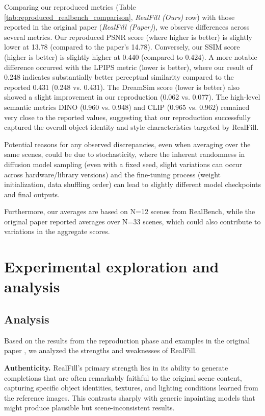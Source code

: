 \documentclass{article}
\begin{document}
Comparing our reproduced metrics (Table \ref{tab:reproduced_realbench_comparison}, \emph{RealFill (Ours)} row) with those reported in the original paper (\emph{RealFill (Paper)}), we observe differences across several metrics.
Our reproduced PSNR score (where higher is better) is slightly lower at 13.78 (compared to the paper's 14.78).
Conversely, our SSIM score (higher is better) is slightly higher at 0.440 (compared to 0.424).
A more notable difference occurred with the LPIPS metric (lower is better), where our result of 0.248 indicates substantially better perceptual similarity compared to the reported 0.431 (0.248 vs. 0.431).
The DreamSim score (lower is better) also showed a slight improvement in our reproduction (0.062 vs. 0.077).
The high-level semantic metrics DINO (0.960 vs. 0.948) and CLIP (0.965 vs. 0.962) remained very close to the reported values, suggesting that our reproduction successfully captured the overall object identity and style characteristics targeted by RealFill.

Potential reasons for any observed discrepancies, even when averaging over the same scenes, could be due to stochasticity, where the inherent randomness in diffusion model sampling (even with a fixed seed, slight variations can occur across hardware/library versions) and the fine-tuning process (weight initialization, data shuffling order) can lead to slightly different model checkpoints and final outputs.

Furthermore, our averages are based on N=12 scenes from RealBench, while the original paper reported averages over N=33 scenes, which could also contribute to variations in the aggregate scores.

\section{Experimental exploration and analysis}
\label{sec:exploration}

\subsection{Analysis}

\label{subsec:original_performance_analysis}
Based on the results from the reproduction phase and examples in the original paper \cite{tang2024realfill}, we analyzed the strengths and weaknesses of RealFill.

\textbf{Authenticity.} RealFill's primary strength lies in its ability to generate completions that are often remarkably faithful to the original scene content, capturing specific object identities, textures, and lighting conditions learned from the reference images. This contrasts sharply with generic inpainting models that might produce plausible but scene-inconsistent results.
\end{document}
